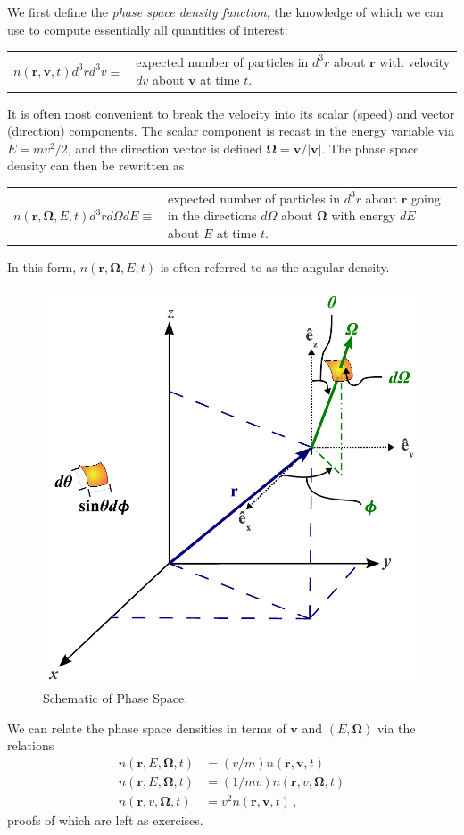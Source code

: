 We first define the \textit{phase space density function}, the knowledge of which we can use to compute essentially all quantities of interest:
\begin{center}
  \begin{tabular}{cp{7.0cm}}
    $n(\mathbf{r},\mathbf{v},t)d^3r d^3v \equiv $ &
    expected number of particles in  $d^3r$  about  $\mathbf{r}$  with velocity  $dv$ about  $\mathbf{v}$ at time $t$.  
  \end{tabular}
\end{center}
It is often most convenient to break the velocity into its scalar (speed) and vector (direction) components.  The scalar component is recast in the energy variable via $E = mv^2/2$, and the direction vector is defined $\mathbf{\Omega}=\mathbf{v}/|\mathbf{v}|$.  The phase space density can then be rewritten as
\begin{center}
  \begin{tabular}{cp{7.0cm}}
    $n(\mathbf{r},\mathbf{\Omega},E,t)d^3r d\Omega dE \equiv $ &
    expected number of particles in  $d^3r$  about  $\mathbf{r}$  going in the directions $d\Omega$ about $\mathbf{\Omega}$ with energy  $dE$ about  $E$ at time $t$.  
  \end{tabular}
\end{center}
In this form, $n(\mathbf{r},\mathbf{\Omega},E,t)$ is often referred to as the angular density.

\begin{figure}
    \begin{center}
    \includegraphics[keepaspectratio, width = 2.7 in]{images/phase_space}
    \end{center}
    \caption{Schematic of Phase Space.}
    \label{fig:phase_space}
\end{figure}

We can relate the phase space densities in terms of $\mathbf{v}$ and $(E,\mathbf{\Omega})$ via the relations
\begin{equation}
 \begin{split}
  n(\mathbf{r},E,\mathbf{\Omega},t) &= (v/m) n(\mathbf{r},\mathbf{v},t) \\
  n(\mathbf{r},E,\mathbf{\Omega},t) &= (1/mv) n(\mathbf{r},v,\mathbf{\Omega},t) \\
  n(\mathbf{r},v,\mathbf{\Omega},t) &= v^2 n(\mathbf{r},\mathbf{v},t) \, ,
 \end{split}
 \label{eq:densityrelations}
\end{equation}
proofs of which are left as exercises.

